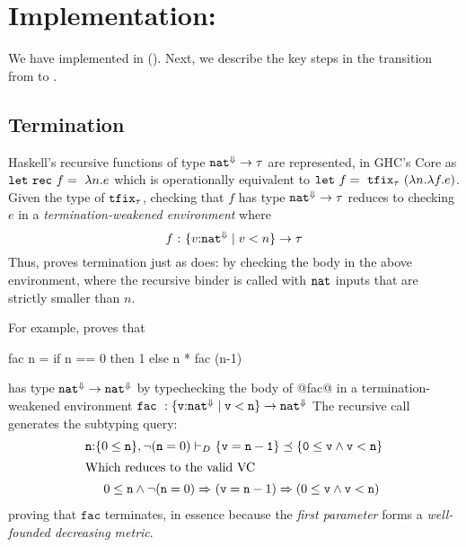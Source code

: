 
\newcommand\factyp{\typ}

\section{Implementation: \toolname}\label{sec:haskell}

We have implemented \declang in \toolname (). 
Next, we describe the key steps in the transition from \declang to \lhaskell.

\subsection{Termination}

Haskell's recursive functions of type ${{{\mathtt{nat}}^{\Downarrow}} \rightarrow \mathit{\tau}}$ 
are represented, in GHC's Core \cite{SulzmannCJD07} as
${\mathtt{let\ rec}\ f = \ \lambda n. e}$ which is operationally
equivalent to ${\mathtt{let}\ f = \ \mathtt{tfix}_{\mathit{\tau}}\ (\lambda n. \lambda f. e)}$.
Given the type of $\mathtt{tfix}_{\mathit{\tau}}$, checking that $f$ has 
type ${{\mathtt{nat}}^{\Downarrow}} \rightarrow \mathit{\tau}$ reduces to checking
$e$ in a \emph{termination-weakened environment} where
$$f \ \colon \ \tfunbasic{\tref{v}{\tnat}{\finite}{v < n}}{\typ}$$
%
Thus, \toolname proves termination just as \declang 
does: by checking the body in the above environment, 
where the recursive binder is called with $\mathtt{nat}$ 
inputs that are strictly smaller than $n$.

For example, \toolname proves that 
%
\begin{code}
  fac n = if n == 0 then 1 else n * fac (n-1)
\end{code}
%
has type ${{\mathtt{nat}}^{\Downarrow}} \rightarrow {\ensuremath{\mathtt{nat}}}^{\Downarrow}$ 
by typechecking the body of @fac@ 
in a termination-weakened environment 
${\mathtt{fac}\ : \tfunbasic{\tref{\ttv}{\tnat}{\finite}{\ttv < \ttn}}{\FinTy{\tnat}}}$
The recursive call generates the subtyping query:
\begin{align*}
\tbind{\ttn}{\{0 \leq \ttn\}}, \lnot (\ttn = 0) \vdash_D &\  \subt{\ttref{v=n-1}}{\ttref{0 \leq v \wedge v < n}}\\ 
\intertext{Which reduces to the valid VC}
0 \leq \ttn \wedge \lnot (\ttn = 0) \Rightarrow &\   (\ttv = \ttn-1) \Rightarrow (0 \leq \ttv \wedge \ttv < \ttn)
\end{align*}
%
proving that $\mathtt{fac}$ terminates, in essence because the
\emph{first parameter} forms a \emph{well-founded decreasing metric}.

